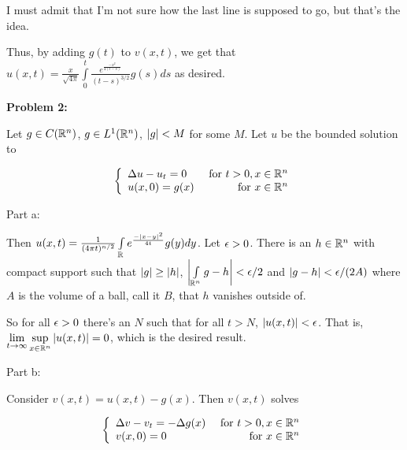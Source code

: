 \documentclass[a4paper,12pt]{article}
\begin{document}
I must admit that I'm not sure how the last line is supposed to go, but that's the idea.

Thus, by adding $g(t)$ to $v(x,t)$, we get that $u(x,t) = \frac{x}{\sqrt{4\pi}} \int\limits_0^t \frac{e^{\frac{-x^2}{4(t-s)}}}{(t-s)^{3/2}} g(s) ds$ as desired.


\shunt

{\bf Problem 2:}

Let $g \in C(\mathbb{R}^n)$, $g \in L^1(\mathbb{R}^n)$, $\left\lvert g \right\rvert < M$ for some $M$. Let $u$ be the bounded solution to 

\begin{displaymath}
   \left\{
     \begin{array}{lr}
       \Delta u -u_t  = 0 & \text{ for } t>0, x \in \mathbb{R}^n \\
       u(x,0) = g(x) & \text{ for } x \in \mathbb{R}^n
     \end{array}
   \right.
\end{displaymath}

Part a:

Then $u(x,t) = \frac{1}{(4\pi t)^{n/2}}\int\limits_{\mathbb{R}} e^{\frac{-\left\lvert x-y \right\rvert^2}{4t}} g(y) dy$. Let $\epsilon >0$. There is an $h \in \mathbb{R}^n$ with compact support such that $\left\lvert g \right\rvert\geq \left\lvert h \right\rvert$, $\left\lvert \int\limits_{\mathbb{R}^n} g - h \right\rvert < \epsilon/2$ and $\left\lvert g-h \right\rvert < \epsilon/(2A)$ where $A$ is the volume of a ball, call it $B$, that $h$ vanishes outside of. %

So for all $\epsilon>0$ there's an $N$ such that for all $t>N$, $\left\lvert u(x,t) \right\rvert < \epsilon$. That is, $\lim\limits_{t \to \infty} \sup\limits_{x \in \mathbb{R}^n} \left\lvert u(x,t) \right\rvert = 0$, which is the desired result.

\shunt

Part b:

Consider $v(x,t) = u(x,t) - g(x)$. Then $v(x,t)$ solves

\begin{displaymath}
   \left\{
     \begin{array}{lr}
       \Delta v -v_t  = -\Delta g(x) & \text{ for } t>0, x \in \mathbb{R}^n \\
       v(x,0) = 0 & \text{ for } x \in \mathbb{R}^n
     \end{array}
   \right.
\end{displaymath}
\end{document}
